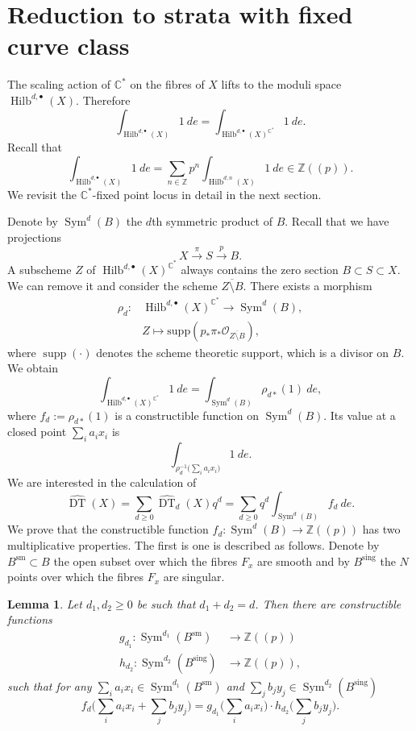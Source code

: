 \documentclass{amsart}
\newtheorem{lemma}[theorem]{Lemma}
\theoremstyle{definition}
\newcommand{\CC} {\mathbb{C}}          %
\newcommand{\ZZ} {\mathbb{Z}}		%
\renewcommand{\O}{\mathcal{O}}
\newcommand{\Sym}{\operatorname{Sym}}
\newcommand{\Hilb}{\operatorname{Hilb}}
\newcommand{\DT}{\operatorname{DT}}
\newcommand{\supp}{\operatorname{supp}}
\newcommand{\sm}{\operatorname{sm}}
\newcommand{\sing}{\operatorname{sing}}
\begin{document}
\section{Reduction to strata with fixed curve class}

The scaling action of $\CC^*$ on the fibres of $X$ lifts to the moduli space $\Hilb^{d,\bullet}(X)$. Therefore
$$
\int_{\Hilb^{d,\bullet}(X)} 1 \ de = \int_{\Hilb^{d,\bullet}(X)^{\CC^*}} 1 \ de.
$$
Recall that 
$$
\int_{\Hilb^{d,\bullet}(X)} 1 \ de = \sum_{n \in \ZZ} p^n \int_{\Hilb^{d,n}(X)} 1 \ de \in \ZZ(\!(p)\!).
$$
We revisit the $\CC^*$-fixed point locus in detail in the next section. 

Denote by $\Sym^d(B)$ the $d$th symmetric product of $B$. Recall that we have projections 
$$
X \stackrel{\pi}{\longrightarrow} S \stackrel{p}{\longrightarrow} B.
$$
A subscheme $Z$ of $ \Hilb^{d,\bullet}(X)^{\CC^*}$ always contains the zero section $B \subset S \subset X$. We can remove it and consider the scheme $\overline{Z \setminus B}$. There exists a morphism
\begin{align*}
\rho_{d} : &\Hilb^{d,\bullet}(X)^{\CC^*} \longrightarrow \Sym^d(B), \\
&Z \mapsto \mathrm{supp}( p_* \pi_* \O_{\overline{Z \setminus B}} ),
\end{align*}
where $\supp(\cdot)$ denotes the scheme theoretic support, which is a divisor on $B$. 
We obtain
$$
\int_{\Hilb^{d,\bullet}(X)^{\CC^*}} 1 \ de = \int_{\Sym^d(B)} \rho_{d*}(1) \ de,
$$
where $f_d := \rho_{d*}(1)$ is a constructible function on $\Sym^d(B)$. Its value at a closed point $\sum_i a_i x_i$ is 
$$
\int_{\rho_{d}^{-1}\big(\sum_i a_i x_i\big)} 1 \ de.
$$
We are interested in the calculation of
$$
\widehat{\DT}(X) = \sum_{d \geq 0} \widehat{\DT}_d(X) q^d =\sum_{d \geq 0} q^d \int_{\Sym^d(B)} f_d \ de.
$$
We prove that the constructible function $f_d : \Sym^d(B) \rightarrow \ZZ(\!(p)\!)$ has two multiplicative properties. The first is one is described as follows. Denote by $B^{\sm} \subset B$ the open subset over which the fibres $F_x$ are smooth and by $B^{\sing}$ the $N$ points over which the fibres $F_x$ are singular.
\begin{lemma} \label{mult1}
Let $d_1, d_2 \geq 0$ be such that $d_1+d_2 = d$. Then there are constructible functions
\begin{align*}
g_{d_1} : \Sym^{d_1}(B^{\sm}) &\longrightarrow \ZZ(\!(p)\!) \\
h_{d_2} : \Sym^{d_2}(B^{\sing}) &\longrightarrow \ZZ(\!(p)\!),
\end{align*}
such that for any $\sum_i a_i x_i \in \Sym^{d_1}(B^{\sm})$ and $\sum_j b_j y_j \in \Sym^{d_2}(B^{\sing})$ 
$$ 
f_d\Big(\sum_i a_i x_i + \sum_j b_j y_j \Big) = g_{d_1}\Big(\sum_i a_i x_i\Big) \cdot h_{d_2}\Big(\sum_j b_j y_j \Big). 
$$
\end{lemma}
\end{document}
